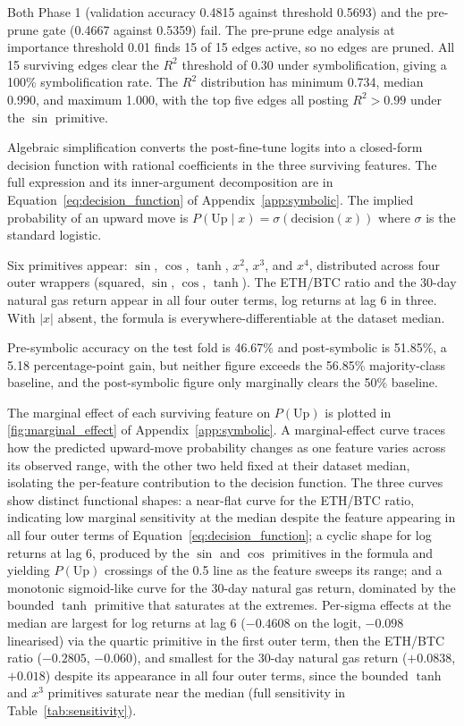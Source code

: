 Both Phase 1 (validation accuracy 0.4815 against threshold 0.5693) and the pre-prune gate (0.4667 against 0.5359) fail. The pre-prune edge analysis at importance threshold 0.01 finds 15 of 15 edges active, so no edges are pruned. All 15 surviving edges clear the $R^2$ threshold of 0.30 under symbolification, giving a 100\% symbolification rate. The $R^2$ distribution has minimum 0.734, median 0.990, and maximum 1.000, with the top five edges all posting $R^2 > 0.99$ under the $\sin$ primitive.

Algebraic simplification converts the post-fine-tune logits into a closed-form decision function with rational coefficients in the three surviving features. The full expression and its inner-argument decomposition are in Equation~\ref{eq:decision_function} of Appendix~\ref{app:symbolic}. The implied probability of an upward move is $P(\text{Up} \mid x) = \sigma(\text{decision}(x))$ where $\sigma$ is the standard logistic.

Six primitives appear: $\sin$, $\cos$, $\tanh$, $x^2$, $x^3$, and $x^4$, distributed across four outer wrappers (squared, $\sin$, $\cos$, $\tanh$). The ETH/BTC ratio and the 30-day natural gas return appear in all four outer terms, log returns at lag 6 in three. With $\lvert x \rvert$ absent, the formula is everywhere-differentiable at the dataset median.

Pre-symbolic accuracy on the test fold is 46.67\% and post-symbolic is 51.85\%, a 5.18 percentage-point gain, but neither figure exceeds the 56.85\% majority-class baseline, and the post-symbolic figure only marginally clears the 50\% baseline.

The marginal effect of each surviving feature on $P(\text{Up})$ is plotted in \label{ref:marginal_effect_call}\autoref{fig:marginal_effect} of Appendix~\ref{app:symbolic}. A marginal-effect curve traces how the predicted upward-move probability changes as one feature varies across its observed range, with the other two held fixed at their dataset median, isolating the per-feature contribution to the decision function. The three curves show distinct functional shapes: a near-flat curve for the ETH/BTC ratio, indicating low marginal sensitivity at the median despite the feature appearing in all four outer terms of Equation~\ref{eq:decision_function}; a cyclic shape for log returns at lag 6, produced by the $\sin$ and $\cos$ primitives in the formula and yielding $P(\text{Up})$ crossings of the 0.5 line as the feature sweeps its range; and a monotonic sigmoid-like curve for the 30-day natural gas return, dominated by the bounded $\tanh$ primitive that saturates at the extremes. Per-sigma effects at the median are largest for log returns at lag 6 ($-0.4608$ on the logit, $-0.098$ linearised) via the quartic primitive in the first outer term, then the ETH/BTC ratio ($-0.2805$, $-0.060$), and smallest for the 30-day natural gas return ($+0.0838$, $+0.018$) despite its appearance in all four outer terms, since the bounded $\tanh$ and $x^3$ primitives saturate near the median (full sensitivity in \label{ref:sensitivity_call}Table~\ref{tab:sensitivity}).